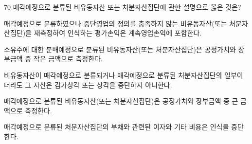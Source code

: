 \begin{question}{70}
매각예정으로 분류된 비유동자산 또는 처분자산집단에 관한 설명으로 옳은 것은?
\begin{choices}
  \item 매각예정으로 분류하였으나 중단영업의 정의를 충족하지 않는 비유동자산(또는 처분자산집단)을 재측정하여 인식하는 평가손익은 계속영업손익에 포함한다.
  \item 소유주에 대한 분배예정으로 분류된 비유동자산(또는 처분자산집단)은 공정가치와 장부금액 중 작은 금액으로 측정한다.
  \item 비유동자산이 매각예정으로 분류되거나 매각예정으로 분류된 처분자산집단의 일부이더라도 그 자산은 감가상각 또는 상각을 중단하지 아니한다.
  \item 매각예정으로 분류된 비유동자산(또는 처분자산집단)은 공정가치와 장부금액 중 큰 금액으로 측정한다.
  \item 매각예정으로 분류된 처분자산집단의 부채와 관련된 이자와 기타 비용은 인식을 중단한다.
\end{choices}
\end{question}
